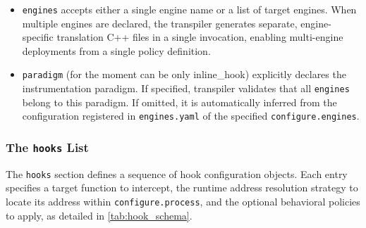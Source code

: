 \begin{itemize}
	\item \texttt{engines} accepts either a single engine name or a list of target engines. When multiple engines are declared, the transpiler generates separate, engine-specific translation C++ files in a single invocation, enabling multi-engine deployments from a single policy definition.
	\item \texttt{paradigm} (for the moment can be only inline\_hook) explicitly declares the instrumentation paradigm. If specified, transpiler validates that all \texttt{engines} belong to this paradigm. If omitted, it is automatically inferred from the configuration registered in \texttt{engines.yaml} of the specified \texttt{configure.engines}.
\end{itemize}

\subsubsection{The \texttt{hooks} List}

The \texttt{hooks} section defines a sequence of hook configuration objects. Each entry specifies a target function to intercept, the runtime address resolution strategy to locate its address within \texttt{configure.process}, and the optional behavioral policies to apply, as detailed in \cref{tab:hook_schema}.

